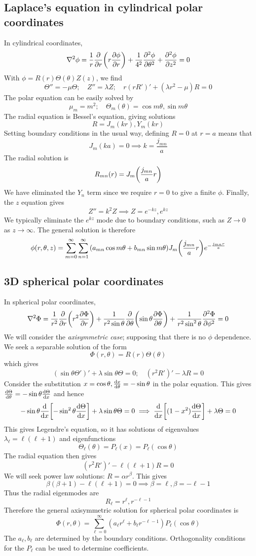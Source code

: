 \documentclass[a4paper]{article}
\begin{document}
\subsection{Laplace's equation in cylindrical polar coordinates}
In cylindrical coordinates,
\[
	\laplacian \phi = \frac{1}{r} \pdv{r} \qty(r \pdv{\phi}{r}) + \frac{1}{4^2} \pdv[2]{\phi}{\theta} + \pdv[2]{\phi}{z} = 0
\]
With \( \phi = R(r) \Theta(\theta) Z(z) \), we find
\[
	\Theta'' = -\mu \Theta;\quad Z'' = \lambda Z;\quad r(rR')' + (\lambda r^2 - \mu) R = 0
\]
The polar equation can be easily solved by
\[
	\mu_m = m^2;\quad \Theta_m(\theta) = \cos m\theta, \sin m\theta
\]
The radial equation is Bessel's equation, giving solutions
\[
	R = J_m(kr), Y_m(kr)
\]
Setting boundary conditions in the usual way, defining \( R=0 \) at \( r = a \) means that
\[
	J_m(ka) = 0 \implies k = \frac{j_{mn}}{a}
\]
The radial solution is
\[
	R_{mn}(r) = J_m\qty(\frac{j_{mn}}{a}r)
\]
We have eliminated the \( Y_n \) term since we require \( r = 0 \) to give a finite \( \phi \).
Finally, the \( z \) equation gives
\[
	Z'' = k^2 Z \implies Z = e^{-kz}, e^{kz}
\]
We typically eliminate the \( e^{kz} \) mode due to boundary conditions, such as \( Z \to 0 \) as \( z \to \infty \).
The general solution is therefore
\[
	\phi(r,\theta,z) = \sum_{m=0}^\infty \sum_{n = 1}^\infty \qty(a_{mn} \cos m\theta + b_{mn} \sin m\theta) J_m\qty(\frac{j_{mn}}{a} r) e^{-\frac{j_{mn}r}{a}}
\]

\subsection{3D spherical polar coordinates}
In spherical polar coordinates,
\[
	\laplacian \Phi = \frac{1}{r^2} \pdv{r} \qty(r^2 \pdv{\Phi}{r}) + \frac{1}{r^2 \sin\theta}\pdv{\theta} \qty(\sin\theta \pdv{\Phi}{\theta}) + \frac{1}{r^2 \sin^2 \theta} \pdv[2]{\Phi}{\phi} = 0
\]
We will consider the \textit{axisymmetric case}; supposing that there is no \( \phi \) dependence.
We seek a separable solution of the form
\[
	\Phi(r,\theta) = R(r) \Theta(\theta)
\]
which gives
\[
	(\sin\theta \Theta')' + \lambda \sin\theta \Theta = 0;\quad (r^2R')' - \lambda R = 0
\]
Consider the substitution \( x = \cos\theta, \dv{x}{\theta} = -\sin\theta \) in the polar equation.
This gives \( \dv{\Theta}{\theta} = -\sin\theta \dv{\Theta}{x} \) and hence
\[
	-\sin\theta \dv{x}\qty[-\sin^2\theta \dv{\Theta}{x}] + \lambda \sin\theta \Theta = 0 \implies \dv{x}\qty[(1-x^2)\dv{\Theta}{x}] + \lambda \Theta = 0
\]
This gives Legendre's equation, so it has solutions of eigenvalues \( \lambda_\ell = \ell (\ell + 1) \) and eigenfunctions
\[
	\Theta_\ell(\theta) = P_\ell(x) = P_\ell(\cos\theta)
\]
The radial equation then gives
\[
	(r^2 R')' - \ell (\ell + 1) R = 0
\]
We will seek power law solutions: \( R = \alpha r^\beta \).
This gives
\[
	\beta(\beta + 1) - \ell(\ell + 1) = 0 \implies \beta = \ell, \beta = -\ell - 1
\]
Thus the radial eigenmodes are
\[
	R_\ell = r^{\ell}, r^{-\ell - 1}
\]
Therefore the general axisymmetric solution for spherical polar coordinates is
\[
	\Phi(r,\theta) = \sum_{\ell = 0}^\infty (a_\ell r^{\ell} + b_\ell r^{-\ell - 1}) P_\ell(\cos\theta)
\]
The \( a_\ell, b_\ell \) are determined by the boundary conditions.
Orthogonality conditions for the \( P_\ell \) can be used to determine coefficients.
\end{document}
